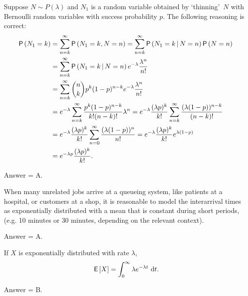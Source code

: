 \begin{exercise}[201802]
Suppose $N\sim P(\lambda)$ and $N_1$ is a random variable obtained by `thinning'~$N$ with Bernoulli random variables with success probability $p$. The following reasoning is correct:
\begin{equation*}
 \begin{split}
 \P{N_1 = k}
&= \sum_{n=k}^\infty \P{N_1 =k, N = n} 
= \sum_{n=k}^\infty \P{N_1 =k\given N = n}\P{N=n} \\
&= \sum_{n=k}^\infty \P{N_1 =k\given N = n}e^{-\lambda} \frac{\lambda^n}{n!}\\
&= \sum_{n=k}^\infty {n \choose k} p^k (1-p)^{n-k} e^{-\lambda} \frac{\lambda^n}{n!} \\
&= e^{-\lambda}\sum_{n=k}^\infty \frac{p^k (1-p)^{n-k}}{k! (n-k)!} \lambda^n
= e^{-\lambda} \frac{(\lambda p)^k}{k!} \sum_{n=k}^\infty \frac{(\lambda (1-p))^{n-k}}{(n-k)!}\\
&= e^{-\lambda} \frac{(\lambda p)^k}{k!} \sum_{n=0}^\infty \frac{(\lambda (1-p))^{n}}{n!}
= e^{-\lambda} \frac{(\lambda p)^k}{k!} e^{\lambda(1-p)} \\
&= e^{-\lambda p} \frac{(\lambda p)^k}{k!}.
 \end{split}
\end{equation*}
\begin{solution}
Answer = A.
\end{solution}
\end{exercise}

\begin{exercise}[201802]
When many unrelated jobs arrive at a queueing system, like patients at a hospital, or customers at a shop, it is reasonable to model the interarrival times as exponentially distributed with a mean that is constant during short periods, (e.g. 10 minutes or 30 minutes, depending on the relevant context). 
\begin{solution}
Answer = A.
\end{solution}
\end{exercise}

\begin{exercise}[201802]
If $X$ is exponentially distributed with rate $\lambda$,
 \begin{equation*}
 \,\mathsf{E}\left[X\right] = \int_0^\infty \lambda e^{-\lambda t}\, \,\text{d}t.
 \end{equation*}
\begin{solution}
Answer = B.
\end{solution}
\end{exercise}

